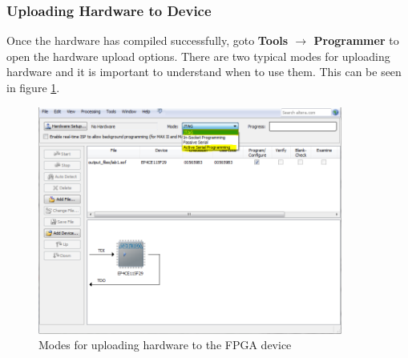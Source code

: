 \subsubsection{Uploading Hardware to Device}

Once the hardware has compiled successfully, goto {\bf Tools $\rightarrow$ Programmer} to open the hardware upload options. There are two typical modes for uploading hardware and it is important to understand when to use them. This can be seen in figure \ref{fig:uploadmethod}.


\begin{figure}[H]
	\centering
	\includegraphics[width=100mm]{Lab1/figures/uploadmethod.png}
	\caption{Modes for uploading hardware to the FPGA device}
	\label{fig:uploadmethod}
\end{figure}

